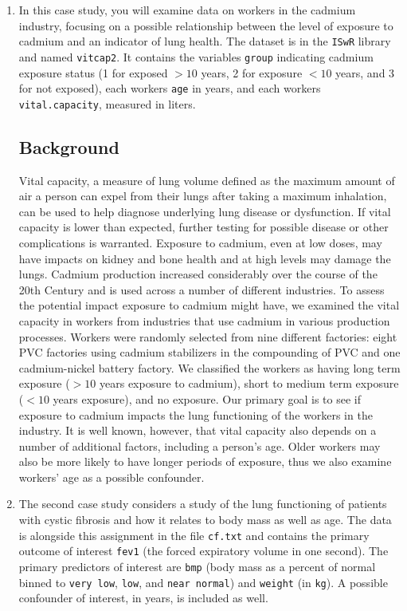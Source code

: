 \documentclass{article}
\begin{document}
	\begin{enumerate}
		\item In this case study, you will examine data on workers in the cadmium industry, focusing on a possible relationship between the level of exposure to cadmium and an indicator of lung health. The dataset is in the \texttt{ISwR} library and named \texttt{vitcap2}. It contains the variables \texttt{group} indicating cadmium exposure status (1 for exposed $>10$ years, 2 for exposure $<10$ years, and 3 for not exposed), each workers \texttt{age} in years, and each workers \texttt{vital.capacity}, measured in liters.

		\subsection*{Background}
				
		Vital capacity, a measure of lung volume defined as the maximum amount of air a person can expel from their lungs after taking a maximum inhalation, can be used to help diagnose underlying lung disease or dysfunction. If vital capacity is lower than expected, further testing for possible disease or other complications is warranted. Exposure to cadmium, even at low doses, may have impacts on kidney and bone health and at high levels may damage the lungs. Cadmium production increased considerably over the course of the 20th Century and is used across a number of different industries. To assess the potential impact exposure to cadmium might have, we examined the vital capacity in workers from industries that use cadmium in various production processes. Workers were randomly selected from nine different factories: eight PVC factories using cadmium stabilizers in the compounding of PVC and one cadmium-nickel battery factory. We classified the workers as having long term exposure ($>10$ years exposure to cadmium), short to medium term exposure ($<10$ years exposure), and no exposure. Our primary goal is to see if exposure to cadmium impacts the lung functioning of the workers in the industry. It is well known, however, that vital capacity also depends on a number of additional factors, including a person's age. Older workers may also be more likely to have longer periods of exposure, thus we also examine workers' age as a possible confounder.
		
		\item The second case study considers a study of the lung functioning of patients with cystic fibrosis and how it relates to body mass as well as age. The data is alongside this assignment in the file \texttt{cf.txt} and contains the primary outcome of interest \texttt{fev1} (the forced expiratory volume in one second). The primary predictors of interest are \texttt{bmp} (body mass as a percent of normal binned to \texttt{very low}, \texttt{low}, and \texttt{near normal}) and \texttt{weight} (in \texttt{kg}). A possible confounder of interest,  in years, is included as well.
		

\end{enumerate}
\end{document}
